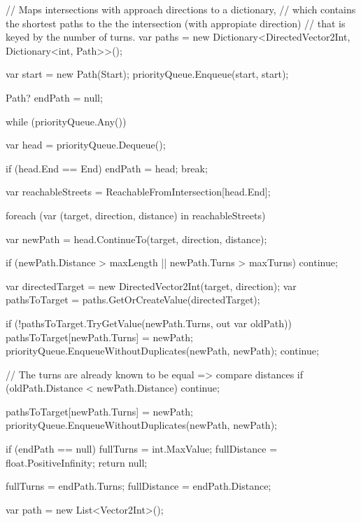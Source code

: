\documentclass{article}
\theoremstyle{nonumberplain}
\begin{document}
\begin{lstcs}[]
{{        // Maps intersections with approach directions to a dictionary,
        // which contains the shortest paths to the the intersection (with appropiate direction)
        // that is keyed by the number of turns.
        var paths = new Dictionary<DirectedVector2Int, Dictionary<int, Path>>();

        var start = new Path(Start);
        priorityQueue.Enqueue(start, start);

        Path? endPath = null;

        while (priorityQueue.Any())
        {
            var head = priorityQueue.Dequeue();

            if (head.End == End)
            {
                endPath = head;
                break;
            }

            var reachableStreets = ReachableFromIntersection[head.End];

            foreach (var (target, direction, distance) in reachableStreets)
            {
                var newPath = head.ContinueTo(target, direction, distance);

                if (newPath.Distance > maxLength
                    || newPath.Turns > maxTurns)
                {
                    continue;
                }

                var directedTarget = new DirectedVector2Int(target, direction);
                var pathsToTarget = paths.GetOrCreateValue(directedTarget);

                if (!pathsToTarget.TryGetValue(newPath.Turns, out var oldPath))
                {
                    pathsToTarget[newPath.Turns] = newPath;
                    priorityQueue.EnqueueWithoutDuplicates(newPath, newPath);
                    continue;
                }

                // The turns are already known to be equal => compare distances
                if (oldPath.Distance < newPath.Distance) continue;

                pathsToTarget[newPath.Turns] = newPath;
                priorityQueue.EnqueueWithoutDuplicates(newPath, newPath);
            }
        }

        if (endPath == null)
        {
            fullTurns = int.MaxValue;
            fullDistance = float.PositiveInfinity;
            return null;
        }

        fullTurns = endPath.Turns;
        fullDistance = endPath.Distance;

        var path = new List<Vector2Int>();

}}
\end{lstcs}
\end{document}
